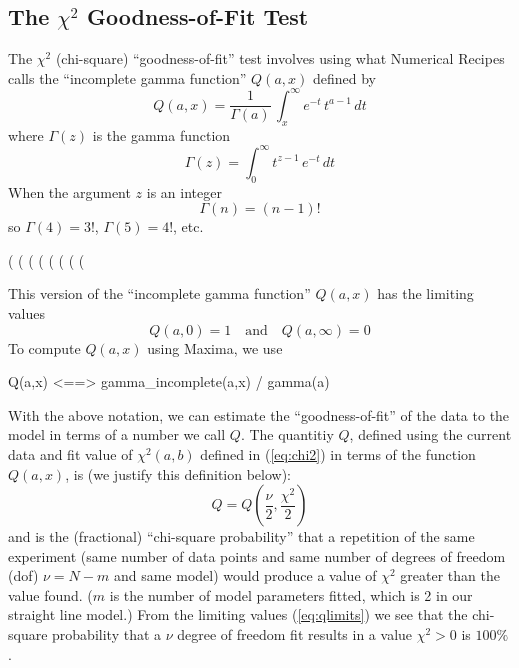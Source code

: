 \documentclass[12pt]{article}
\begin{document}
\subsection{The $\chi^2$ Goodness-of-Fit Test}
The $\chi^2$ (chi-square) ``goodness-of-fit''  test involves using
  what Numerical Recipes calls the ``incomplete gamma function'' $Q(a,x)$
    defined by
\begin{equation}
  Q(a,x) = \frac{1}{\Gamma(a)}\,\int_x^{\infty} e^{-t}\,t^{a-1}\,dt
\end{equation}
  where  $\Gamma(z)$ is the gamma function
\begin{equation}
  \Gamma(z) = \int_0^\infty t^{z-1}\,e^{-t}\,dt
\end{equation}  
When the argument $z$ is an integer
\begin{equation}
   \Gamma(n) = (n - 1)!
\end{equation}
    so $\Gamma(4) = 3!$,  $\Gamma(5) = 4!$, etc.
\begin{myVerbatim}
(%
(%
(%
(%
(%
(%
(%
(%
\end{myVerbatim}
This version of the ``incomplete gamma function'' $Q(a,x)$ has the limiting values
\begin{equation}   \label{eq:qlimits}
  Q(a,0) = 1 \quad \text{and} \quad Q(a,\infty) = 0
\end{equation}
To compute $Q(a,x)$ using Maxima, we use
\begin{myVerbatim1}
  Q(a,x)  <==>  gamma_incomplete(a,x) / gamma(a)
\end{myVerbatim1}
With the above notation, we can estimate the ``goodness-of-fit'' of the data
   to the model in terms of a number we call $Q$. 
The quantitiy $Q$, defined using the current data and fit value of $\chi^2(a,b)$ 
   defined in (\ref{eq:chi2}) in terms of the function $Q(a,x)$, is (we justify this
   definition below):
\begin{equation}
  Q = Q \left( \frac{\nu}{2}, \frac{\chi^2}{2} \right)
\end{equation}
  and is the (fractional) ``chi-square probability'' that a repetition of the same experiment (same number
    of data points and same number of degrees of freedom (dof) $\nu = N - m$ and same model) would produce
	a value of $\chi^2$ greater than the value found.
($m$ is the number of model parameters fitted, which is 2 in our straight line model.)	
From the limiting values (\ref{eq:qlimits}) we see that the chi-square probability that a
   $\nu$ degree of freedom fit results in a value $\chi^2 > 0$ is $100\%$.\\
   
\end{document}

